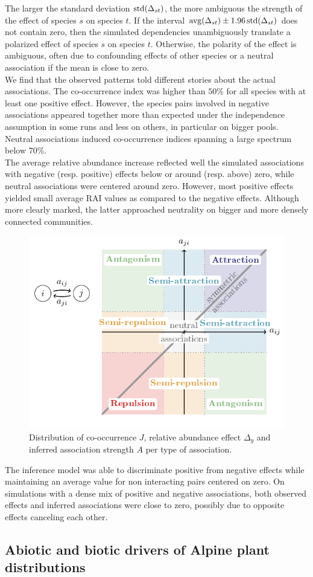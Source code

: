 \documentclass[10pt,a4paper]{article}
\newcommand{\inclPlt}[2]{\includegraphics[page=#1]{tikz_figures.pdf}}
\begin{document}
The larger the standard deviation $\operatorname{std}(\Delta_{st})$, the more ambiguous the strength of the effect of species $s$ on species $t$. If the interval $\operatorname{avg}(\Delta_{st}) \pm 1.96 \operatorname{std}(\Delta_{st})$ does not contain zero, then the simulated dependencies unambiguously translate a polarized effect of species $s$ on species $t$. Otherwise, the polarity of the effect is ambiguous, often due to confounding effects of other species or a neutral association if the mean is close to zero.\\

We find that the observed patterns told different stories about the actual associations. The co-occurrence index was higher than $50\%$ for all species with at least one positive effect. However, the species pairs involved in negative associations appeared together more than expected under the independence assumption in some runs and less on others, in particular on bigger pools. Neutral associations induced co-occurrence indices spanning a large spectrum below $70\%$. \\

The average relative abundance increase reflected well the simulated associations with negative (resp. positive) effects below or around (resp. above) zero, while neutral associations were centered around zero. However, most positive effects yielded small average RAI values as compared to the negative effects. Although more clearly marked, the latter approached neutrality on bigger and more densely connected communities.\\

\begin{figure}[bthp]
  \centering
    \inclPlt{6}{box_simul}
	\caption{Distribution of co-occurrence $J$, relative abundance effect $\Delta_y$ and inferred association strength $A$ per type of association.}
	\label{patterns}
\end{figure}

The inference model was able to discriminate positive from negative effects while maintaining an average value for non interacting pairs centered on zero. On simulations with a dense mix of positive and negative associations, both observed effects and inferred associations were close to zero, possibly due to opposite effects canceling each other. 

\subsection{Abiotic and biotic drivers of Alpine plant distributions}
\end{document}
